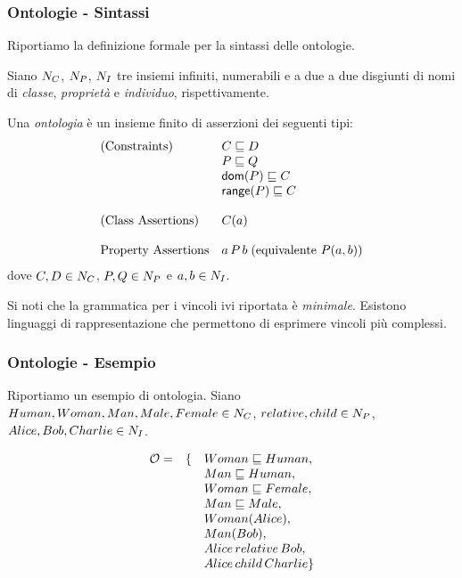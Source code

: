 \documentclass[8pt]{beamer}
\begin{document}
\begin{frame}
\frametitle{Ontologie - Sintassi}

Riportiamo la definizione formale per la sintassi delle ontologie.
\vspace{\baselineskip}

Siano $N_C$, $N_P$, $N_I$ tre insiemi infiniti, numerabili e 
a due a due disgiunti di nomi di \emph{classe}, \emph{propriet\`a} e \emph{individuo},
rispettivamente.
\vspace{\baselineskip}

Una \emph{ontologia} \`e un insieme finito di asserzioni dei seguenti tipi:
\[
 \begin{array}{ll}
  \mbox{(Constraints)} & C \sqsubseteq D\\
  & P \sqsubseteq Q \\
  & \mathsf{dom}(P) \sqsubseteq C \\
  & \mathsf{range}(P) \sqsubseteq C \\
  &\\
  \mbox{(Class Assertions)} & C(a)\\
  &\\
  \mbox{Property Assertions} & a\,P\,b\;(\mbox{equivalente }P(a,b))\\
 \end{array}
\]
dove $C, D \in N_C$, $P, Q \in N_P$ e $a, b \in N_I$.
\vspace{\baselineskip}

Si noti che la grammatica per i vincoli ivi riportata \`e \emph{minimale}.
Esistono linguaggi di rappresentazione che permettono di esprimere vincoli
pi\`u complessi.
\end{frame}

\newcommand{\Ont}{\mathcal{O}}
\newcommand{\Ontp}{\mathcal{O'}}

\begin{frame}
\frametitle{Ontologie - Esempio}
Riportiamo un esempio di ontologia. Siano $Human, Woman, Man, Male, Female \in
N_C$, $relative, child \in N_P$, $Alice, Bob, Charlie \in N_I$.
\vspace{\baselineskip}

\[
\begin{array}{ccl}
 \Ont = & \{ & Woman \Issub Human, \\
 &&Man \Issub Human, \\
 &&Woman \Issub Female, \\
 &&Man \Issub Male, \\
 &&Woman(Alice), \\
 &&Man(Bob),\\
 &&Alice\,relative\,Bob,\\ 
 &&Alice\,child\,Charlie \}
\end{array} 
\]
\end{frame}
\end{document}
